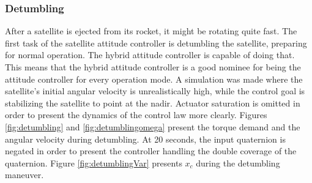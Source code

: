 
\subsubsection{Detumbling}

After a satellite is ejected from its rocket, it might be rotating quite fast. The first task of the satellite attitude controller is detumbling the satellite, preparing for normal operation. The hybrid attitude controller is capable of doing that. This means that the hybrid attitude controller is a good nominee for being the attitude controller for every operation mode. A simulation was made where the satellite's initial angular velocity is unrealistically high, while the control goal is stabilizing the satellite to point at the nadir. Actuator saturation is omitted in order to present the dynamics of the control law more clearly. Figures \ref{fig:detumbling} and \ref{fig:detumblingomega} present the torque demand and the angular velocity during detumbling. At 20 seconds, the input quaternion is negated in order to present the controller handling the double coverage of the quaternion. Figure \ref{fig:detumblingVar} presents $x_c$ during the detumbling maneuver.



